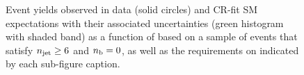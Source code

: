 \begin{figure}[h!]
\begin{center}
    \caption{Event yields observed in data (solid circles) and CR-fit SM expectations with their associated uncertainties (green histogram with shaded band) as a function of \HTmiss based on a sample of events that satisfy $n_{\text{jet}} \geq 6$ and $n_{\text{b}} = 0$, as well as the requirements on \scalht indicated by each sub-figure caption. }
    \label{fig:mhtval_ge6j_eq0b}
  \end{center}
\end{figure}

